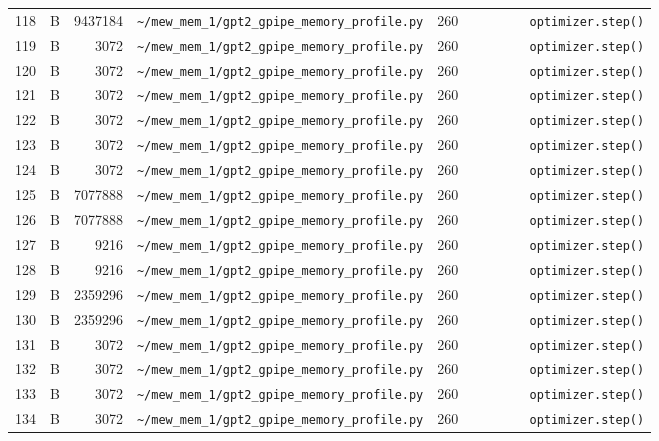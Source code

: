\documentclass{article}
\begin{document}
\begin{longtable}{r l r p{6.5cm} r p{7.0cm}}
118 & B & 9437184 & \lstinline|~/mew_mem_1/gpt2_gpipe_memory_profile.py| & 260 & \lstinline|        optimizer.step()| \\
119 & B & 3072 & \lstinline|~/mew_mem_1/gpt2_gpipe_memory_profile.py| & 260 & \lstinline|        optimizer.step()| \\
120 & B & 3072 & \lstinline|~/mew_mem_1/gpt2_gpipe_memory_profile.py| & 260 & \lstinline|        optimizer.step()| \\
121 & B & 3072 & \lstinline|~/mew_mem_1/gpt2_gpipe_memory_profile.py| & 260 & \lstinline|        optimizer.step()| \\
122 & B & 3072 & \lstinline|~/mew_mem_1/gpt2_gpipe_memory_profile.py| & 260 & \lstinline|        optimizer.step()| \\
123 & B & 3072 & \lstinline|~/mew_mem_1/gpt2_gpipe_memory_profile.py| & 260 & \lstinline|        optimizer.step()| \\
124 & B & 3072 & \lstinline|~/mew_mem_1/gpt2_gpipe_memory_profile.py| & 260 & \lstinline|        optimizer.step()| \\
125 & B & 7077888 & \lstinline|~/mew_mem_1/gpt2_gpipe_memory_profile.py| & 260 & \lstinline|        optimizer.step()| \\
126 & B & 7077888 & \lstinline|~/mew_mem_1/gpt2_gpipe_memory_profile.py| & 260 & \lstinline|        optimizer.step()| \\
127 & B & 9216 & \lstinline|~/mew_mem_1/gpt2_gpipe_memory_profile.py| & 260 & \lstinline|        optimizer.step()| \\
128 & B & 9216 & \lstinline|~/mew_mem_1/gpt2_gpipe_memory_profile.py| & 260 & \lstinline|        optimizer.step()| \\
129 & B & 2359296 & \lstinline|~/mew_mem_1/gpt2_gpipe_memory_profile.py| & 260 & \lstinline|        optimizer.step()| \\
130 & B & 2359296 & \lstinline|~/mew_mem_1/gpt2_gpipe_memory_profile.py| & 260 & \lstinline|        optimizer.step()| \\
131 & B & 3072 & \lstinline|~/mew_mem_1/gpt2_gpipe_memory_profile.py| & 260 & \lstinline|        optimizer.step()| \\
132 & B & 3072 & \lstinline|~/mew_mem_1/gpt2_gpipe_memory_profile.py| & 260 & \lstinline|        optimizer.step()| \\
133 & B & 3072 & \lstinline|~/mew_mem_1/gpt2_gpipe_memory_profile.py| & 260 & \lstinline|        optimizer.step()| \\
134 & B & 3072 & \lstinline|~/mew_mem_1/gpt2_gpipe_memory_profile.py| & 260 & \lstinline|        optimizer.step()| \\

\end{longtable}
\end{document}
